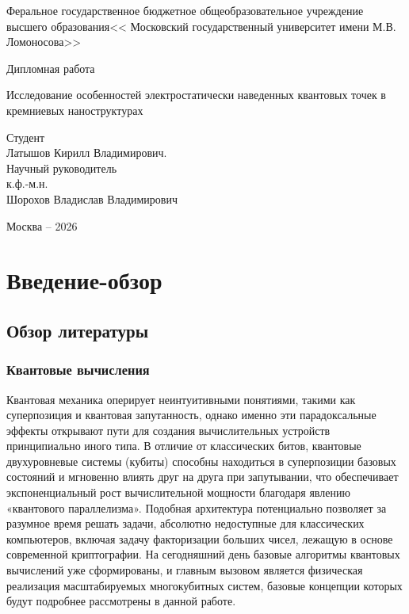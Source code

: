 \documentclass[a4paper,14pt]{extreport} %
\begin{document}
\begin{titlepage}
\begin{center}{\bfseries}
\large Феральное государственное бюджетное общеобразовательное учреждение высшего образования<< Московский государственный университет имени М.В. Ломоносова>>
\vfill
\centerline{{Дипломная работа}}
\vspace{1cm}
\large{Исследование особенностей электростатически  наведенных квантовых точек в кремниевых наноструктурах}
\vfill
\begin {flushright}
\large{Студент \\ Латышов Кирилл Владимирович. \\ Научный руководитель\\ к.ф.-м.н.\\ Шорохов Владислав Владимирович}
\end{flushright}
\vfil
\centerline {Москва -- 2026}
\end{center}
\end{titlepage}
\tableofcontents %
\setcounter{page}{2}

\chapter{Введение-обзор}

\section{Обзор литературы}

\subsection{Квантовые вычисления}

Квантовая механика оперирует неинтуитивными понятиями, такими как суперпозиция и квантовая запутанность, однако именно эти парадоксальные эффекты открывают пути для создания вычислительных устройств принципиально иного типа. В отличие от классических битов, квантовые двухуровневые системы (кубиты) способны находиться в суперпозиции базовых состояний и мгновенно влиять друг на друга при запутывании, что обеспечивает экспоненциальный рост вычислительной мощности благодаря явлению «квантового параллелизма». Подобная архитектура потенциально позволяет за разумное время решать задачи, абсолютно недоступные для классических компьютеров, включая задачу факторизации больших чисел, лежащую в основе современной криптографии. На сегодняшний день базовые алгоритмы квантовых вычислений уже сформированы, и главным вызовом является физическая реализация масштабируемых многокубитных систем, базовые концепции которых будут подробнее рассмотрены в данной работе.
\end{document}
